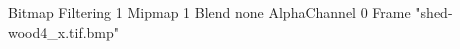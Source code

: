 {Bitmap
	{Filtering 1}
	{Mipmap 1}
	{Blend none}
	{AlphaChannel 0}
	{Frame "shed-wood4_x.tif.bmp"}
}
